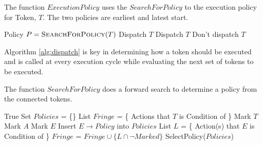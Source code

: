 
\begin{algorithm} [H]
  \caption{\small The function $ExecutionPolicy$ uses the $SearchForPolicy$ to 
   the execution policy for Token, $T$. The two policies are earliest and latest start.}
  \label{alg:dispatch}
\label{ExecutionPolicy}
\begin{algorithmic}
\small 
{}
\State Policy $P = \textsc{SearchForPolicy}( T )$
	\State \Return Dispatch $T$
	\State \Return Dispatch $T$
\Else
	\State \Return Don't dispatch $T$
\EndIf
\EndFunction
\end{algorithmic}
\end{algorithm}

Algorithm \ref{alg:dispatch} is key in determining how a token should
be executed and is called at every execution cycle while evaluating
the next set of tokens to be executed.  %

\begin{algorithm} [htb]
  \caption{\small The function $SearchForPolicy$ does a forward search
    to determine a policy from the connected tokens.}
  \label{SearchForGoal}
\begin{algorithmic}
  \small
  \State \Return True
  \Else 
  \State Set $Policies$ = \{\}
  \State List $Fringe$ = \{ Actions that $T$ is Condition of \}
  \State Mark $T$
  \State Mark $A$
  \State Mark $E$
  \State Insert $E \to Policy$ into $Policies$
  \EndIf
  \State List $L$ = \{ Action(s) that $E$ is Condition of \}
  \State $Fringe$ = $Fringe \cup \{L \cap \neg Marked \}$ 
  \EndFor
  \EndFor
  \EndIf
  \State \Return SelectPolicy($Policies$)
\EndFunction
\end{algorithmic}
\end{algorithm}



